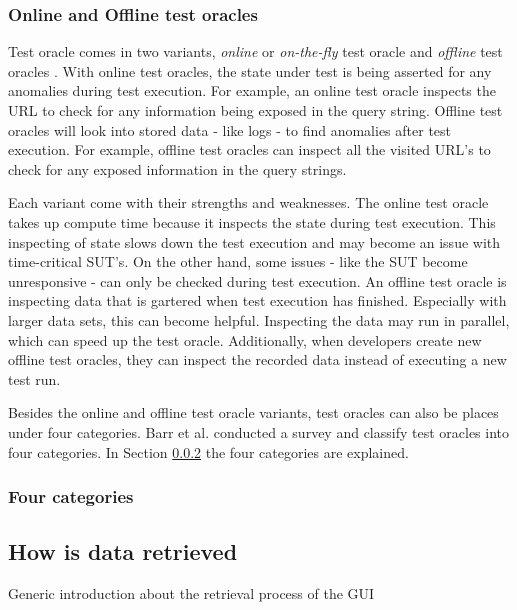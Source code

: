 \subsubsection{Online and Offline test oracles}
    Test oracle comes in two variants, \emph{online} or \emph{on-the-fly} test oracle and \emph{offline} test oracles \cite{VosAho2021}. With online test oracles, the state under test is being asserted for any anomalies during test execution. For example,  an online test oracle inspects the URL to check for any information being exposed in the query string. Offline test oracles will look into stored data - like logs - to find anomalies after test execution. For example, offline test oracles can inspect all the visited URL's to check for any exposed information in the query strings. 

    Each variant come with their strengths and weaknesses. The online test oracle takes up compute time because it inspects the state during test execution. This inspecting of state slows down the test execution and may become an issue with time-critical SUT's. On the other hand, some issues - like the SUT become unresponsive - can only be checked during test execution. An offline test oracle is inspecting data that is gartered when test execution has finished. Especially with larger data sets, this can become helpful. Inspecting the data may run in parallel, which can speed up the test oracle. Additionally, when developers create new offline test oracles, they can inspect the recorded data instead of executing a new test run.

    Besides the online and offline test oracle variants, test oracles can also be places under four categories. Barr et al. conducted a survey and classify test oracles into four categories. In Section \ref{to:four-cat} the four categories are explained. 

    \subsubsection{Four categories} \label{to:four-cat}
 

\subsection{How is data retrieved}

    Generic introduction about the retrieval process of the GUI


